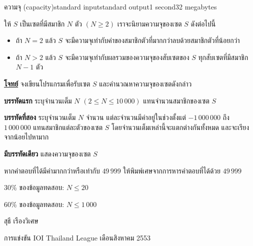 \documentclass[11pt,a4paper]{article}
\begin{document}
\begin{problem}{ความจุ (capacity)}{standard input}{standard output}{1 second}{32 megabytes}

ให้ $S$ เป็นเซตที่มีสมาชิก $N$ ตัว $(N \geq 2)$ เราจะนิยามความจุของเซต $S$ ดังต่อไปนี้
\begin{itemize}

\item ถ้า $N = 2$ แล้ว $S$ จะมีความจุเท่ากับค่าของสมาชิกตัวที่มากกว่าลบด้วยสมาชิกตัวที่น้อยกว่า
\item ถ้า $N > 2$ แล้ว $S$ จะมีความจุเท่ากับผลรวมของความจุของสับเซตของ $S$ ทุกสับเซตที่มีสมาชิก $N-1$ ตัว
\end{itemize}

\bigskip
\underline{\textbf{โจทย์}}  จงเขียนโปรแกรมเพื่อรับเซต $S$ และคำนวณหาความจุของเซตดังกล่าว


\InputFile

\textbf{บรรทัดแรก} ระบุจำนวนเต็ม $N$ $(2 \leq N \leq 10\,000)$ แทนจำนวนสมาชิกของเซต $S$

\textbf{บรรทัดที่สอง} ระบุจำนวนเต็ม $N$ จำนวน แต่ละจำนวนมีค่าอยู่ในช่วงตั้งแต่ $-1\,000\,000$ ถึง $1\,000\,000$ แทนสมาชิกแต่ละตัวของเซต $S$ โดยจำนวนเต็มเหล่านี้จะแตกต่างกันทั้งหมด และจะเรียงจากน้อยไปหามาก



\OutputFile

\textbf{มีบรรทัดเดียว} แสดงความจุของเซต $S$

หากคำตอบที่ได้มีค่ามากกว่าหรือเท่ากับ $49\,999$ ให้พิมพ์เศษจากการหารคำตอบที่ได้ด้วย $49\,999$

\Examples

\begin{example}
%
%
\end{example}

\newpage
\Scoring

$30$\% ของข้อมูลทดสอบ: $N \leq 20$

$60$\% ของข้อมูลทดสอบ: $N \leq 1\,000$

\Source

สุธี เรืองวิเศษ

การแข่งขัน IOI Thailand League เดือนสิงหาคม 2553 

\end{problem}
\end{document}
